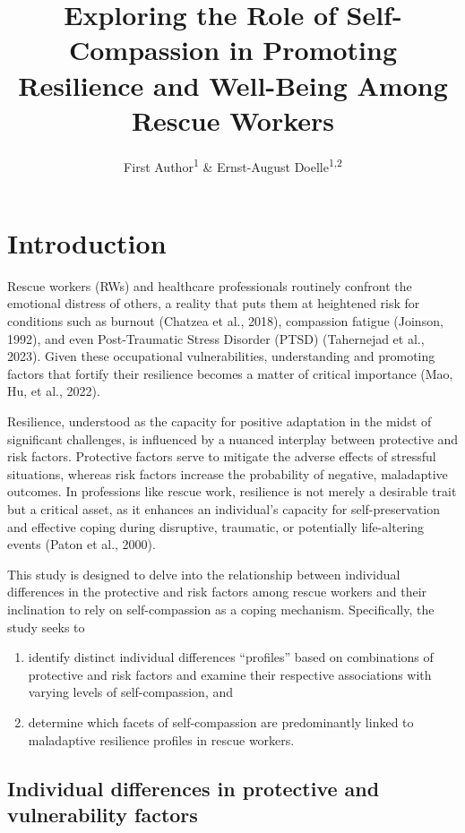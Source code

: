 \documentclass[
  man]{apa7}
\title{Exploring the Role of Self-Compassion in Promoting Resilience and Well-Being Among Rescue Workers}
\author{First Author\textsuperscript{1} \& Ernst-August Doelle\textsuperscript{1,2}}
\date{}
\affiliation{\vspace{0.5cm}\textsuperscript{1} Wilhelm-Wundt-University\\\textsuperscript{2} Konstanz Business School}
\providecommand{\tightlist}{%
  \setlength{\itemsep}{0pt}\setlength{\parskip}{0pt}}
\begin{document}
\maketitle

\hypertarget{introduction}{%
\section{Introduction}\label{introduction}}

Rescue workers (RWs) and healthcare professionals routinely confront the emotional distress of others, a reality that puts them at heightened risk for conditions such as burnout (Chatzea et al., 2018), compassion fatigue (Joinson, 1992), and even Post-Traumatic Stress Disorder (PTSD) (Tahernejad et al., 2023). Given these occupational vulnerabilities, understanding and promoting factors that fortify their resilience becomes a matter of critical importance (Mao, Hu, et al., 2022).

Resilience, understood as the capacity for positive adaptation in the midst of significant challenges, is influenced by a nuanced interplay between protective and risk factors. Protective factors serve to mitigate the adverse effects of stressful situations, whereas risk factors increase the probability of negative, maladaptive outcomes. In professions like rescue work, resilience is not merely a desirable trait but a critical asset, as it enhances an individual's capacity for self-preservation and effective coping during disruptive, traumatic, or potentially life-altering events (Paton et al., 2000).

This study is designed to delve into the relationship between individual differences in the protective and risk factors among rescue workers and their inclination to rely on self-compassion as a coping mechanism. Specifically, the study seeks to

\begin{enumerate}
\def\labelenumi{\arabic{enumi}.}
\tightlist
\item
  identify distinct individual differences ``profiles'' based on combinations of protective and risk factors and examine their respective associations with varying levels of self-compassion, and
\item
  determine which facets of self-compassion are predominantly linked to maladaptive resilience profiles in rescue workers.
\end{enumerate}

\hypertarget{individual-differences-in-protective-and-vulnerability-factors}{%
\subsection{Individual differences in protective and vulnerability factors}\label{individual-differences-in-protective-and-vulnerability-factors}}
\end{document}

